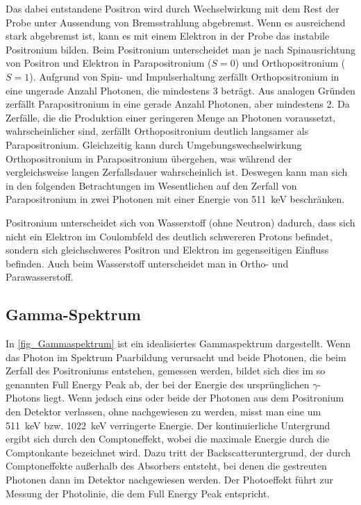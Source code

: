 \documentclass[
	a4paper,
	12pt,
	pagesize,
	ngerman
]{scrartcl}
\begin{document}
	Das dabei entstandene Positron wird durch Wechselwirkung mit dem Rest der Probe unter Aussendung von Bremsstrahlung abgebremst.
	Wenn es ausreichend stark abgebremst ist, kann es mit einem Elektron in der Probe das instabile Positronium bilden.
	Beim Positronium unterscheidet man je nach Spinausrichtung von Positron und Elektron in Parapositronium ($S=0$) und Orthopositronium ($S=1$).
	Aufgrund von Spin- und Impulserhaltung zerfällt Orthopositronium in eine ungerade Anzahl Photonen, die mindestens \num{3} beträgt.
	Aus analogen Gründen zerfällt Parapositronium in eine gerade Anzahl Photonen, aber mindestens \num{2}.
	Da Zerfälle, die die Produktion einer geringeren Menge an Photonen voraussetzt, wahrscheinlicher sind, zerfällt Orthopositronium deutlich langsamer als Parapositronium.
	Gleichzeitig kann durch Umgebungswechselwirkung Orthopositronium in Parapositronium übergehen, was während der vergleichsweise langen Zerfallsdauer wahrscheinlich ist.
	Deswegen kann man sich in den folgenden Betrachtungen im Wesentlichen auf den Zerfall von Parapositronium in zwei Photonen mit einer Energie von \SI{511}{keV} beschränken.

	Positronium unterscheidet sich von Wasserstoff (ohne Neutron) dadurch, dass sich nicht ein Elektron im Coulombfeld des deutlich schwereren Protons befindet, sondern sich gleichschweres Positron und Elektron im gegenseitigen Einfluss befinden.
	Auch beim Wasserstoff unterscheidet man in Ortho- und Parawasserstoff.

	\subsection{Gamma-Spektrum}

		In \cref{fig_Gammaspektrum} ist ein idealisiertes Gammaspektrum dargestellt.
		Wenn das Photon im Spektrum Paarbildung verursacht und beide Photonen, die beim Zerfall des Positroniums entstehen, gemessen werden, bildet sich dies im so genannten Full Energy Peak ab, der bei der Energie des ursprünglichen $\gamma$-Photons liegt.
		Wenn jedoch eins oder beide der Photonen aus dem Positronium den Detektor verlassen, ohne nachgewiesen zu werden, misst man eine um \SI{511}{keV} bzw. \SI{1022}{keV} verringerte Energie.
		Der kontinuierliche Untergrund ergibt sich durch den Comptoneffekt, wobei die maximale Energie durch die Comptonkante bezeichnet wird.
		Dazu tritt der Backscatteruntergrund, der durch Comptoneffekte außerhalb des Absorbers entsteht, bei denen die gestreuten Photonen dann im Detektor nachgewiesen werden.
		Der Photoeffekt führt zur Messung der Photolinie, die dem Full Energy Peak entspricht.
\end{document}
